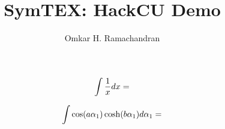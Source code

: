 \documentclass[english]{article}
\newcommand{\eval}[1]{\immediate\write18{python3 symtex.py '#1' > intermediate.txt}}
\begin{document}
\title{SymTEX: HackCU Demo}

\author{Omkar H. Ramachandran}
\maketitle

$$ \intop{\frac{1}{x} dx} = \eval{\intop{frac{1}{x} dx}} $$


$$\intop{\cos(a \alpha_1) \cosh(b \alpha_1) d\alpha_1} = \eval{\intop{cos(a alpha_1) cosh(b alpha_1) dalpha_1}}$$
\end{document}
